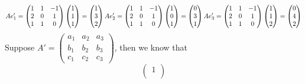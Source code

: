 \begin{homeworkProblem}
\solution
\[
A e_1' = \begin{pmatrix}
    1 & 1 & -1 \\
    2 & 0 & 1 \\
    1 & 1 & 0
\end{pmatrix}
\begin{pmatrix}
    1 \\
    1 \\
    1
\end{pmatrix} = \begin{pmatrix}
    1 \\
    3 \\
    2
\end{pmatrix}\\
A e_2' = \begin{pmatrix}
    1 & 1 & -1 \\
    2 & 0 & 1 \\
    1 & 1 & 0
\end{pmatrix}
\begin{pmatrix}
    1 \\
    0 \\
    1
\end{pmatrix} = \begin{pmatrix}
    0 \\
    3 \\
    1
\end{pmatrix}\\
A e_3' = \begin{pmatrix}
    1 & 1 & -1 \\
    2 & 0 & 1 \\
    1 & 1 & 0
\end{pmatrix}
\begin{pmatrix}
    1 \\
    1 \\
    2
\end{pmatrix} = \begin{pmatrix}
    0 \\
    4 \\
    2
\end{pmatrix}
\]
Suppose $A' = \left( \begin{smallmatrix}a_1 & a_2 & a_3 \\ b_1 & b_2 & b_3 \\ c_1 & c_2 & c_3 \end{smallmatrix} \right)$, then we know that
\[
\begin{pmatrix}
    1 \\

\end{pmatrix}\]
\end{homeworkProblem}
